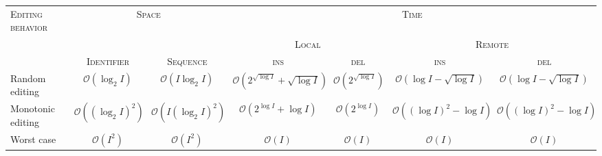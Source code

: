 
\begin{tabular}{@{}lcccccc@{}}
  \toprule
  \textsc{Editing behavior} & \multicolumn{2}{c}{\textsc{Space}} & \multicolumn{4}{c}{\textsc{Time}} \\ \cmidrule{4-7}
  & & & \multicolumn{2}{c}{\textsc{Local}} & \multicolumn{2}{c}{\textsc{Remote}} \\ \cmidrule{2-7}
  & \textsc{Identifier} & \textsc{Sequence} & \textsc{ins} & \textsc{del} & \textsc{ins} & \textsc{del}  \\ \midrule
  Random editing & $\mathcal{O}(\log_2 I)$ & $\mathcal{O}(I\log_2 I)$ & $\mathcal{O}(2^{\sqrt{\log I}}+\sqrt{\log I})$ & $\mathcal{O}(2^{\sqrt{\log I}})$ & $\mathcal{O}(\log I - \sqrt{\log I})$ & $\mathcal{O}(\log I - \sqrt{\log I})$ \\
  Monotonic editing & $\mathcal{O}((\log_2 I)^2)$ & $\mathcal{O}(I(\log_2 I)^2)$ & $\mathcal{O}(2^{\log I}+\log I)$ & $\mathcal{O}(2^{\log I})$ & $\mathcal{O}((\log I)^2-\log I)$ & $\mathcal{O}((\log I)^2-\log I)$ \\
  Worst case & $\mathcal{O}(I^2)$ & $\mathcal{O}(I^2)$ & $\mathcal{O}(I)$ & $\mathcal{O}(I)$ & $\mathcal{O}(I)$ & $\mathcal{O}(I)$\\ \bottomrule
\end{tabular}


